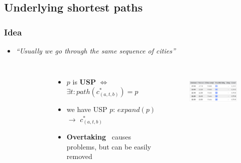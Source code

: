 \documentclass[]{beamer}
\newcommand{\inputTikZ}[1]{%
  }
\newcommand{\inputTikZ}[1]{%
    \beginpgfgraphicnamed{#1-external}%
    \endpgfgraphicnamed%
  }
\begin{document}
        \subsection{Underlying shortest paths}
        \begin{frame}
            \frametitle{Idea}
			\begin{itemize}
                \item \textit{``Usually we go through the same sequence of cities''}
            \end{itemize}
            \vspace{0.5cm}
            \begin{columns}[c]
            \column{2.7in}
            	\vspace{-1cm}
	            \begin{figure}[h]
					\scriptsize
	                \begin{center}
	                    \inputTikZ{./tikzpics/pathfunc}
	                \end{center}
	            \end{figure}
	            \vspace{-0.7cm}
	            \begin{itemize}
	            	\small
	            	\item $p$ is \textbf{USP} $\iff$ $\exists t: path(c_{(a, t, b)}^{*}) = p$
	            	\item we have USP $p$: $expand(p)$ $\rightarrow$ $c_{(a, t, b)}^{*}$
	            	\item<2-> \textbf{Overtaking}~\cite{timetablemodelsalgs07} causes problems, but can be easily removed
	            \end{itemize}
	        \column{2.3in}
		        \vspace{-0.5cm}
	        	\begin{figure}[h!]
	                \includegraphics[height=0.9in]{redundancy.png}
	            \end{figure}
\end{columns}
\end{frame}
\end{document}
